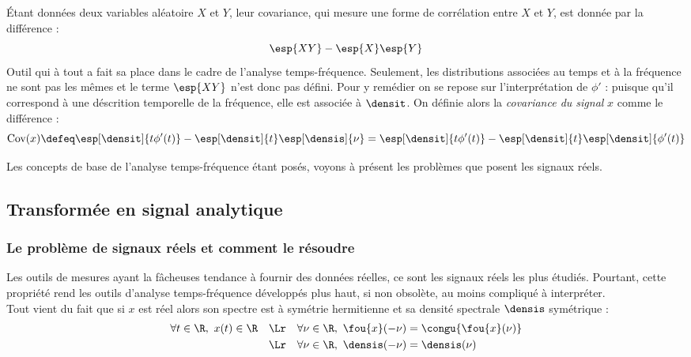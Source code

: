 \begin{definition}[Covariance]\label{def:cova_signal}
	Étant données deux variables aléatoire $X$ et $Y$, leur covariance, qui mesure une forme de corrélation entre $X$ et $Y$, est donnée par la différence :
	\[\esp{XY}-\esp{X}\esp{Y}\]
	Outil qui à tout a fait sa place dans le cadre de l'analyse temps-fréquence. Seulement, les distributions associées au temps et à la fréquence ne sont pas les mêmes et le terme $\esp{XY}$ n'est donc pas défini.
	Pour y remédier on se repose sur l'interprétation de $\phi'$ : puisque qu'il correspond à une déscrition temporelle de la fréquence, elle est associée à $\densit$. On définie alors la \emph{covariance du signal} $x$ comme le différence :
	\begin{equation}\label{eq:cov_signal}
		\text{Cov}(x) \defeq \esp[\densit]{t\phi'(t)} - \esp[\densit]{t} \esp[\densis]{\nu} = \esp[\densit]{t\phi'(t)} - \esp[\densit]{t} \esp[\densit]{\phi'(t)}
	\end{equation}
\end{definition}

Les concepts de base de l'analyse temps-fréquence étant posés, voyons à présent les problèmes que posent les signaux réels.



\subsection{Transformée en signal analytique}

\subsubsection{Le problème de signaux réels et comment le résoudre}\label{subsec:transfo_SA}


Les outils de mesures ayant la fâcheuses tendance à fournir des données réelles, ce sont les signaux réels les plus étudiés.
Pourtant, cette propriété rend les outils d'analyse temps-fréquence développés plus haut, si non obsolète, au moins compliqué à interpréter.
\\
Tout vient du fait que si $x$ est réel alors son spectre est à symétrie hermitienne et sa densité spectrale $\densis$ symétrique :
\begin{align*}
\forall t\in\R,\ x(t)\in\R \quad &\Lr \quad \forall \nu\in\R,\ \fou{x}(-\nu) = \congu{\fou{x}(\nu)} \\
	&\Lr \quad \forall \nu\in\R,\ \densis(-\nu) = \densis(\nu)
\end{align*}
\\

